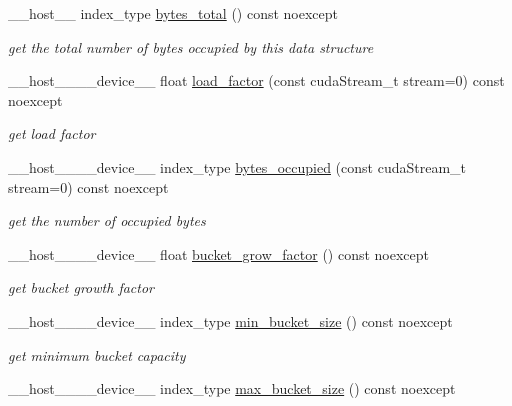 \begin{DoxyCompactItemize}
\+\_\+\+\_\+host\+\_\+\+\_\+ index\+\_\+type \hyperlink{classwarpcore_1_1storage_1_1multi__value_1_1BucketListStore_a42c56265d7617fd305690e14bda34bad}{bytes\+\_\+total} () const noexcept
\begin{DoxyCompactList}\small\item\em get the total number of bytes occupied by this data structure \end{DoxyCompactList}\item 
\+\_\+\+\_\+host\+\_\+\+\_\+\+\_\+\+\_\+device\+\_\+\+\_\+ float \hyperlink{classwarpcore_1_1storage_1_1multi__value_1_1BucketListStore_a195a0df8c935bf26300d2939cbd04b0f}{load\+\_\+factor} (const cuda\+Stream\+\_\+t stream=0) const noexcept
\begin{DoxyCompactList}\small\item\em get load factor \end{DoxyCompactList}\item 
\+\_\+\+\_\+host\+\_\+\+\_\+\+\_\+\+\_\+device\+\_\+\+\_\+ index\+\_\+type \hyperlink{classwarpcore_1_1storage_1_1multi__value_1_1BucketListStore_a73b327d7b9ba9460e90791a8cb15a357}{bytes\+\_\+occupied} (const cuda\+Stream\+\_\+t stream=0) const noexcept
\begin{DoxyCompactList}\small\item\em get the number of occupied bytes \end{DoxyCompactList}\item 
\+\_\+\+\_\+host\+\_\+\+\_\+\+\_\+\+\_\+device\+\_\+\+\_\+ float \hyperlink{classwarpcore_1_1storage_1_1multi__value_1_1BucketListStore_aec5200166b68b8b852ad51f908904f2c}{bucket\+\_\+grow\+\_\+factor} () const noexcept
\begin{DoxyCompactList}\small\item\em get bucket growth factor \end{DoxyCompactList}\item 
\+\_\+\+\_\+host\+\_\+\+\_\+\+\_\+\+\_\+device\+\_\+\+\_\+ index\+\_\+type \hyperlink{classwarpcore_1_1storage_1_1multi__value_1_1BucketListStore_aa4dd16de3f389257c0e7a75b807c2c52}{min\+\_\+bucket\+\_\+size} () const noexcept
\begin{DoxyCompactList}\small\item\em get minimum bucket capacity \end{DoxyCompactList}\item 
\+\_\+\+\_\+host\+\_\+\+\_\+\+\_\+\+\_\+device\+\_\+\+\_\+ index\+\_\+type \hyperlink{classwarpcore_1_1storage_1_1multi__value_1_1BucketListStore_aa3160abbdf2196314e3cd0e2e2d5a47a}{max\+\_\+bucket\+\_\+size} () const noexcept

\end{DoxyCompactItemize}
